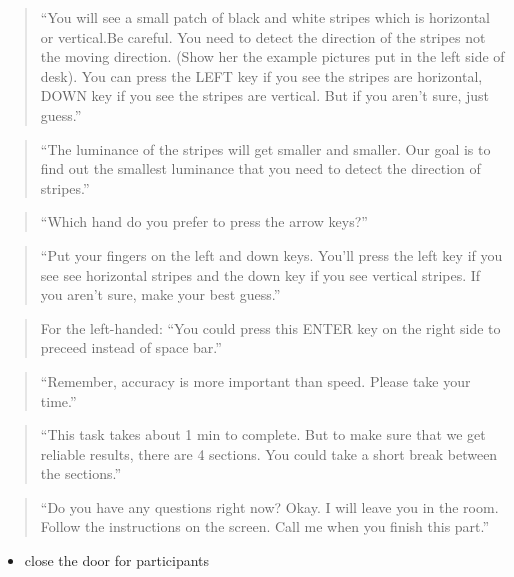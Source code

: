 \documentclass[]{article}
\providecommand{\tightlist}{%
  \setlength{\itemsep}{0pt}\setlength{\parskip}{0pt}}
\begin{document}
\begin{quote}
``You will see a small patch of black and white stripes which is
horizontal or vertical.Be careful. You need to detect the direction of
the stripes not the moving direction. (Show her the example pictures put
in the left side of desk). You can press the LEFT key if you see the
stripes are horizontal, DOWN key if you see the stripes are vertical.
But if you aren't sure, just guess.''
\end{quote}

\begin{quote}
``The luminance of the stripes will get smaller and smaller. Our goal is
to find out the smallest luminance that you need to detect the direction
of stripes.''
\end{quote}

\begin{quote}
``Which hand do you prefer to press the arrow keys?''
\end{quote}

\begin{quote}
``Put your fingers on the left and down keys. You'll press the left key
if you see see horizontal stripes and the down key if you see vertical
stripes. If you aren't sure, make your best guess.''
\end{quote}

\begin{quote}
For the left-handed: ``You could press this ENTER key on the right side
to preceed instead of space bar.''
\end{quote}

\begin{quote}
``Remember, accuracy is more important than speed. Please take your
time.''
\end{quote}

\begin{quote}
``This task takes about 1 min to complete. But to make sure that we get
reliable results, there are 4 sections. You could take a short break
between the sections.''
\end{quote}

\begin{quote}
``Do you have any questions right now? Okay. I will leave you in the
room. Follow the instructions on the screen. Call me when you finish
this part.''
\end{quote}

\begin{itemize}
\tightlist
\item
  close the door for participants
\end{itemize}
\end{document}
